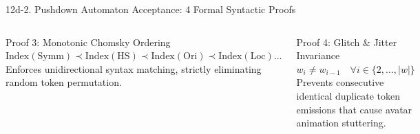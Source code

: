\documentclass[aspectratio=169,xcolor={table,dvipsnames}]{beamer}
\begin{document}
\begin{frame}[t]{12d-2. Pushdown Automaton Acceptance: 4 Formal Syntactic Proofs}
\begin{columns}[T]
    \begin{block}{Proof 3: Monotonic Chomsky Ordering}
        \fontsize{6.6pt}{8.4pt}\selectfont
        $\text{Index}(\text{Symm}) \prec \text{Index}(\text{HS}) \prec \text{Index}(\text{Ori}) \prec \text{Index}(\text{Loc}) \dots$\\
        Enforces unidirectional syntax matching, strictly eliminating random token permutation.
    \end{block}

    \begin{block}{Proof 4: Glitch \& Jitter Invariance}
        \fontsize{6.6pt}{8.4pt}\selectfont
        $w_i \neq w_{i-1} \quad \forall i \in \{2, \dots, |w|\}$\\
        Prevents consecutive identical duplicate token emissions that cause avatar animation stuttering.
    \end{block}
\end{columns}

\vspace{1.2mm}
\centering
{}
\end{frame}
\end{document}

